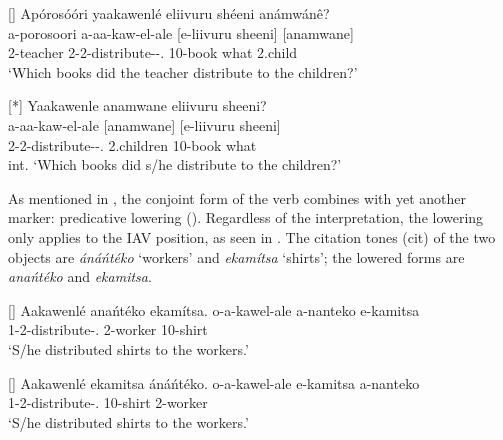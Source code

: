 \documentclass[output=paper]{langscibook}
\begin{document}
\z

\ex
\label{bkm:Ref95378900}
\ea
[]{
Apórosóóri yaakawenlé eliivuru shéeni anámwánê?\\
\gll
a-porosoori  a-aa-kaw-el-ale  [e-liivuru  sheeni] 
 [anamwane] \\
2-teacher  2\SM{}-2\OM{}-distribute-\APPL{}-\PFV{}.\CJ{}  {\db}10-book  what  {\db}2.child\\
\glt
‘Which books did the teacher distribute to the children?’\\
}

\ex
[*]{
Yaakawenle anamwane eliivuru sheeni?\\
\gll
a-aa-kaw-el-ale  [anamwane] [e-liivuru  sheeni]\\
2\SM{}-2\OM{}-distribute-\APPL{}-\PFV{}.\CJ{}  {\db}2.children  {\db}10-book  what\\
\glt
int. ‘Which books did s/he distribute to the children?’\\
}


\z
\z

As mentioned in , the conjoint form of the verb combines with yet another marker: predicative lowering (\PRL{}). Regardless of the interpretation, the lowering only applies to the IAV position, as seen in . The citation tones (cit) of the two objects are \textit{ánáńtéko} ‘workers’ and \textit{ekamítsa} ‘shirts’; the lowered forms are \textit{anańtéko} and \textit{ekamitsa}.\largerpage[2]

\ea
\label{bkm:Ref110326752}
\ea
[]{
   Aakawenlé anańtéko ekamítsa.    
\gll
o-a-kawel-ale  a-nanteko  e-kamitsa\\
1\SM{}-2\OM{}-distribute-\PFV{}.\CJ{}  2-worker  10-shirt\\
\glt
‘S/he distributed shirts to the workers.’\\
}


\ex
[]{
  Aakawenlé ekamitsa áná\'{n}téko.    
\gll
o-a-kawel-ale  e-kamitsa  a-nanteko\\
1\SM{}-2\OM{}-distribute-\PFV{}.\CJ{}  10-shirt  2-worker\\
\glt
‘S/he distributed shirts to the workers.’\\
}
\end{document}
